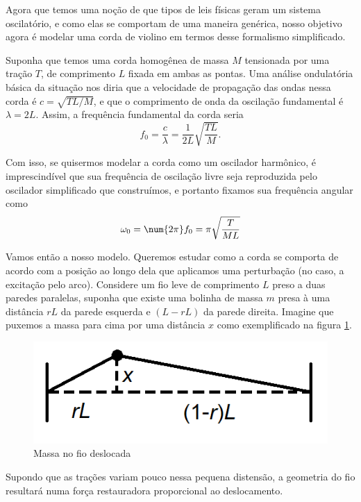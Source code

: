 \documentclass[]{IMTexam}
\begin{document}
\begin{questions}
	\bigskip

	 \label{ques:q2}
	Agora que temos uma noção de que tipos de leis físicas geram um sistema oscilatório, e como elas se comportam de uma maneira genérica, nosso objetivo agora é modelar uma corda de violino em termos desse formalismo simplificado.

	Suponha que temos uma corda homogênea de massa $ M $ tensionada por uma tração $ T $, de comprimento $ L $ fixada em ambas as pontas. Uma análise ondulatória básica da situação nos diria que a velocidade de propagação das ondas nessa corda é $ c = \sqrt{TL/M} $, e que o comprimento de onda da oscilação fundamental é $ \lambda = 2L $. Assim, a frequência fundamental da corda seria
	\[ f_0=\dfrac{c}{\lambda}=\dfrac{1}{2L}\sqrt{\dfrac{TL}{M}}. \]

	Com isso, se quisermos modelar a corda como um oscilador harmônico, é imprescindível que
	sua frequência de oscilação livre seja reproduzida pelo oscilador simplificado que construímos, e portanto fixamos sua frequência angular como
	\begin{equation}\label{eq:angFreq}
		\omega_0=\num{2\pi}f_0=\pi\sqrt{\dfrac{T}{ML}}
	\end{equation}

	Vamos então a nosso modelo. Queremos estudar como a corda se comporta de acordo com a posição ao longo dela que aplicamos uma perturbação (no caso, a excitação pelo arco). Considere um fio leve de comprimento $ L $ preso a duas paredes paralelas, suponha que existe uma bolinha de massa $ m $ presa à uma distância $ rL $ da parede esquerda e $ (L - rL) $ da parede direita. Imagine que puxemos a massa para cima por uma distância $ x $ como exemplificado na figura \ref{fig:fig2}.

	\begin{figure}[H]
		\centering
		\includegraphics[width=0.5\linewidth]{screenshot002}
		\caption{Massa no fio deslocada}
		\label{fig:fig2}
	\end{figure}

	Supondo que as trações variam pouco nessa pequena distensão, a geometria do fio resultará numa força restauradora proporcional ao deslocamento.

	\begin{parts}

\end{parts}
\end{questions}
\end{document}
